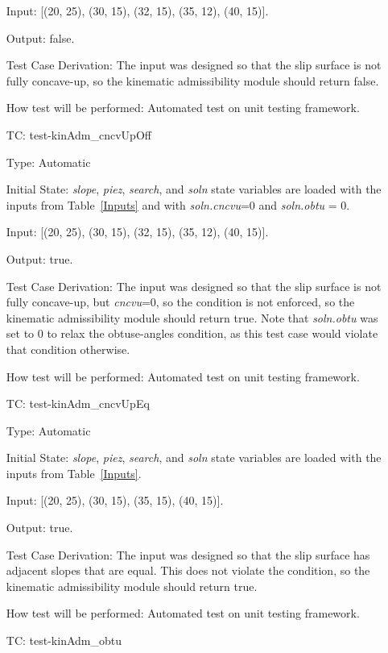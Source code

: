 \documentclass[12pt, titlepage]{article}
\newcounter{utestnum} %
\begin{document}
\begin{enumerate}[label=TC\arabic*:,ref={\arabic*}]
	Input: [(20, 25), (30, 15), (32, 15), (35, 12), (40, 15)].
	
	Output: false.
	
	Test Case Derivation: The input was designed so that the slip surface is 
	not fully concave-up, so the kinematic admissibility module should return 
	false.
	
	How test will be performed: Automated test on unit testing framework.
	
	\item [TC\refstepcounter{utestnum}\theutestnum: \label{TC_KinAdmCncvUpOff}] 
	test-kinAdm\_cncvUpOff
	
	Type: Automatic
	
	Initial State: \textit{slope}, \textit{piez}, \textit{search}, and 
	\textit{soln} state variables are loaded with the inputs from 
	Table~\ref{Inputs} and with \textit{soln.cncvu}=0 and \textit{soln.obtu} = 
	0.
	
	Input: [(20, 25), (30, 15), (32, 15), (35, 12), (40, 15)].
	
	Output: true.
	
	Test Case Derivation: The input was designed so that the slip surface is 
	not fully concave-up, but \textit{cncvu}=0, so the condition is not 
	enforced, so the kinematic admissibility module should return true. Note 
	that \textit{soln.obtu} was set to 0 to relax the obtuse-angles condition, 
	as this test case would violate that condition otherwise.
	
	How test will be performed: Automated test on unit testing framework.
	
	\item [TC\refstepcounter{utestnum}\theutestnum: \label{TC_KinAdmCncvUpEq}] 
	test-kinAdm\_cncvUpEq
	
	Type: Automatic
	
	Initial State: \textit{slope}, \textit{piez}, \textit{search}, and 
	\textit{soln} state variables are loaded with the inputs from 
	Table~\ref{Inputs}.
	
	Input: [(20, 25), (30, 15), (35, 15), (40, 15)].
	
	Output: true.
	
	Test Case Derivation: The input was designed so that the slip surface has 
	adjacent slopes that are equal. This does not violate the condition, so the 
	kinematic admissibility module should return true.
	
	How test will be performed: Automated test on unit testing framework.
	
	\item [TC\refstepcounter{utestnum}\theutestnum: \label{TC_KinAdmObtu}] 
	test-kinAdm\_obtu
	

\end{enumerate}
\end{document}
